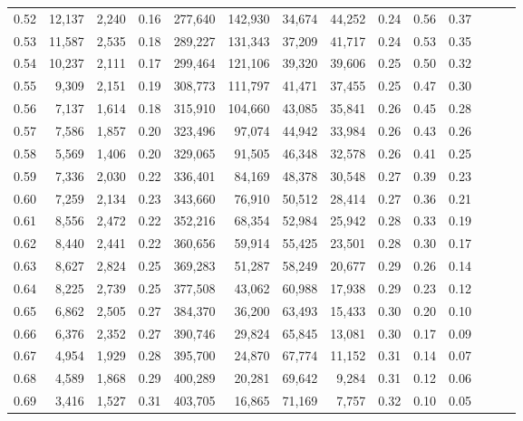 \begin{tabular}{rrrrrrrrrrrrrr}
0.52 &  12,137 &  2,240 &  0.16 &  277,640 &  142,930 &  34,674 &  44,252 &  0.24 &  0.56 &      0.37 \\
0.53 &  11,587 &  2,535 &  0.18 &  289,227 &  131,343 &  37,209 &  41,717 &  0.24 &  0.53 &      0.35 \\
0.54 &  10,237 &  2,111 &  0.17 &  299,464 &  121,106 &  39,320 &  39,606 &  0.25 &  0.50 &      0.32 \\
0.55 &   9,309 &  2,151 &  0.19 &  308,773 &  111,797 &  41,471 &  37,455 &  0.25 &  0.47 &      0.30 \\
0.56 &   7,137 &  1,614 &  0.18 &  315,910 &  104,660 &  43,085 &  35,841 &  0.26 &  0.45 &      0.28 \\
0.57 &   7,586 &  1,857 &  0.20 &  323,496 &   97,074 &  44,942 &  33,984 &  0.26 &  0.43 &      0.26 \\
0.58 &   5,569 &  1,406 &  0.20 &  329,065 &   91,505 &  46,348 &  32,578 &  0.26 &  0.41 &      0.25 \\
0.59 &   7,336 &  2,030 &  0.22 &  336,401 &   84,169 &  48,378 &  30,548 &  0.27 &  0.39 &      0.23 \\
0.60 &   7,259 &  2,134 &  0.23 &  343,660 &   76,910 &  50,512 &  28,414 &  0.27 &  0.36 &      0.21 \\
0.61 &   8,556 &  2,472 &  0.22 &  352,216 &   68,354 &  52,984 &  25,942 &  0.28 &  0.33 &      0.19 \\
0.62 &   8,440 &  2,441 &  0.22 &  360,656 &   59,914 &  55,425 &  23,501 &  0.28 &  0.30 &      0.17 \\
0.63 &   8,627 &  2,824 &  0.25 &  369,283 &   51,287 &  58,249 &  20,677 &  0.29 &  0.26 &      0.14 \\
0.64 &   8,225 &  2,739 &  0.25 &  377,508 &   43,062 &  60,988 &  17,938 &  0.29 &  0.23 &      0.12 \\
0.65 &   6,862 &  2,505 &  0.27 &  384,370 &   36,200 &  63,493 &  15,433 &  0.30 &  0.20 &      0.10 \\
0.66 &   6,376 &  2,352 &  0.27 &  390,746 &   29,824 &  65,845 &  13,081 &  0.30 &  0.17 &      0.09 \\
0.67 &   4,954 &  1,929 &  0.28 &  395,700 &   24,870 &  67,774 &  11,152 &  0.31 &  0.14 &      0.07 \\
0.68 &   4,589 &  1,868 &  0.29 &  400,289 &   20,281 &  69,642 &   9,284 &  0.31 &  0.12 &      0.06 \\
0.69 &   3,416 &  1,527 &  0.31 &  403,705 &   16,865 &  71,169 &   7,757 &  0.32 &  0.10 &      0.05 \\

\end{tabular}
